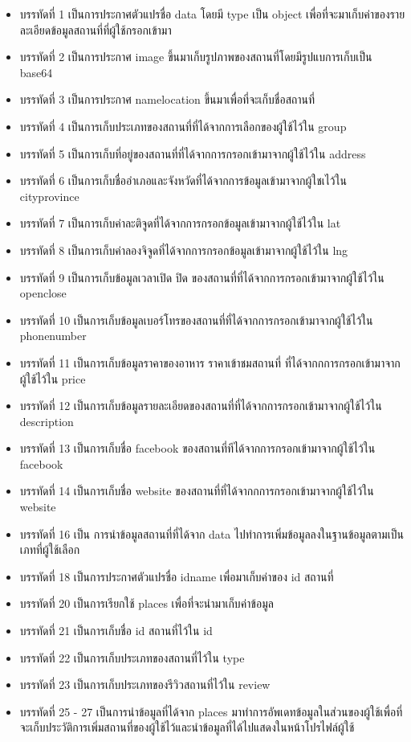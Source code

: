 \begin{itemize}[label={--}]
\item บรรทัดที่ 1 เป็นการประกาศตัวแปรชื่อ data โดยมี type เป็น object เพื่อที่จะมาเก็บค่าของรายละเอียดข้อมูลสถานที่ที่ผู้ใช้กรอกเข้ามา
\item บรรทัดที่ 2 เป็นการประกาศ image ขึ้นมาเก็บรูปภาพของสถานที่โดยมีรูปแบการเก็บเป็น base64
\item บรรทัดที่ 3 เป็นการประกาศ namelocation ขึ้นมาเพื่อที่จะเก็บชื่อสถานที่
\item บรรทัดที่ 4 เป็นการเก็บประเภทของสถานที่ที่ได้จากการเลือกของผู้ใช้ไว้ใน group 
\item บรรทัดที่ 5 เป็นการเก็บที่อยู่ของสถานที่ที่ได้จากการกรอกเข้ามาจากผู้ใช้ไว้ใน address
\item บรรทัดที่ 6 เป็นการเก็บชื่ออำเภอและจังหวัดที่ได้จากการข้อมูลเข้ามาจากผู้ใชเไว้ใน cityprovince
\item บรรทัดที่ 7 เป็นการเก็บค่าละติจูดที่ได้จากการกรอกข้อมูลเข้ามาจากผู้ใช้ไว้ใน lat
\item บรรทัดที่ 8 เป็นการเก็บค่าลองจิจูดที่ได้จากการกรอกข้อมูลเข้ามาจากผู้ใช้ไว้ใน lng
\item บรรทัดที่ 9 เป็นการเก็บข้อมูลเวลาเปิด ปิด ของสถานที่ที่ได้จากการกรอกเข้ามาจากผู้ใช้ไว้ใน openclose
\item บรรทัดที่ 10 เป็นการเก็บข้อมูลเบอร์โทรของสถานที่ที่ได้จากการกรอกเข้ามาจากผู้ใช้ไว้ใน phonenumber
\item บรรทัดที่ 11 เป็นการเก็บข้อมูลราคาของอาหาร ราคาเข้าชมสถานที่ ที่ได้จากกการกรอกเข้ามาจากผู้ใช้ไว้ใน price
\item บรรทัดที่ 12 เป็นการเก็บข้อมูลรายละเอียดของสถานที่ที่ได้จากการกรอกเข้ามาจากผู้ใช้ไว้ใน description
\item บรรทัดที่ 13 เป็นการเก็บชื่อ facebook ของสถานที่ทีได้จากการกรอกเข้ามาจากผู้ใช้ไว้ใน facebook
\item บรรทัดที่ 14 เป็นการเก็บชื่อ website ของสถานที่ที่ได้จากกการกรอกเข้ามาจากผู้ใช้ไว้ใน website
\item บรรทัดที่ 16 เป็น การนำข้อมูลสถานที่ที่ได้จาก data ไปทำการเพิ่มข้อมูลลงในฐานข้อมูลตามเป็นเภทที่ผู้ใช้เลือก
\item บรรทัดที่ 18 เป็นการประกาศตัวแปรชื่อ idname เพื่อมาเก็บค่าของ id สถานที่
\item บรรทัดที่ 20 เป็นการเรียกใช้ places เพื่อที่จะนำมาเก็บค่าข้อมูล
\item บรรทัดที่ 21 เป็นการเก็บชื่อ id สถานที่ไว้ใน id
\item บรรทัดที่ 22 เป็นการเก็บประเภทของสถานที่ไว้ใน type
\item บรรทัดที่ 23 เป็นการเก็บประเภทของรีวิวสถานที่ไว้ใน review
\item บรรทัดที่ 25 - 27 เป็นการนำข้อมูลที่ได้จาก places มาทำการอัพเดทข้อมูลในส่วนของผู้ใช้เพื่อที่จะเก็บประวัติการเพิ่มสถานที่ของผู้ใช้ไว้และนำข้อมูลที่ได้ไปแสดงในหน้าโปรไฟล์ผู้ใช้
\end{itemize}
\newpage

